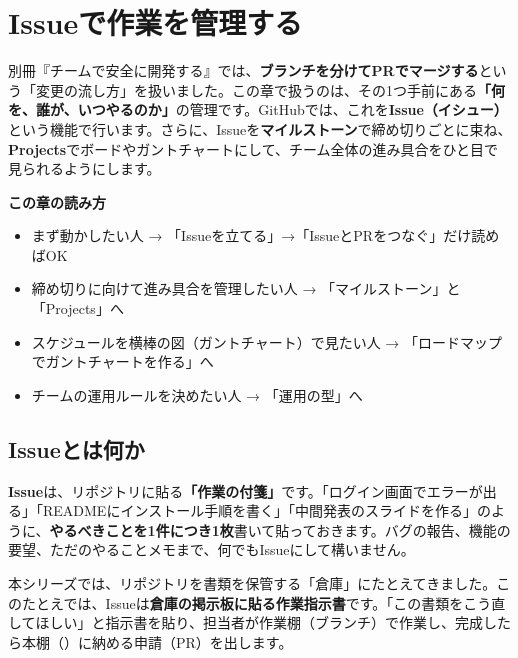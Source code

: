 \chapter{Issueで作業を管理する}

別冊『チームで安全に開発する』では、\textbf{ブランチを分けてPRでマージする}という「変更の流し方」を扱いました。この章で扱うのは、その1つ手前にある\textbf{「何を、誰が、いつやるのか」}の管理です。GitHubでは、これを\textbf{Issue（イシュー）}という機能で行います。さらに、Issueを\textbf{マイルストーン}で締め切りごとに束ね、\textbf{Projects}でボードやガントチャートにして、チーム全体の進み具合をひと目で見られるようにします。

\begin{hintbox}
\textbf{この章の読み方}
\begin{itemize}[leftmargin=1.4em, nosep]
  \item まず動かしたい人 → 「Issueを立てる」→「IssueとPRをつなぐ」だけ読めばOK
  \item 締め切りに向けて進み具合を管理したい人 → 「マイルストーン」と「Projects」へ
  \item スケジュールを横棒の図（ガントチャート）で見たい人 → 「ロードマップでガントチャートを作る」へ
  \item チームの運用ルールを決めたい人 → 「運用の型」へ
\end{itemize}
\end{hintbox}

\section{Issueとは何か}

\textbf{Issue}は、リポジトリに貼る\textbf{「作業の付箋」}です。「ログイン画面でエラーが出る」「READMEにインストール手順を書く」「中間発表のスライドを作る」のように、\textbf{やるべきことを1件につき1枚}書いて貼っておきます。バグの報告、機能の要望、ただのやることメモまで、何でもIssueにして構いません。

本シリーズでは、リポジトリを書類を保管する「倉庫」にたとえてきました。このたとえでは、Issueは\textbf{倉庫の掲示板に貼る作業指示書}です。「この書類をこう直してほしい」と指示書を貼り、担当者が作業棚（ブランチ）で作業し、完成したら本棚（）に納める申請（PR）を出します。

